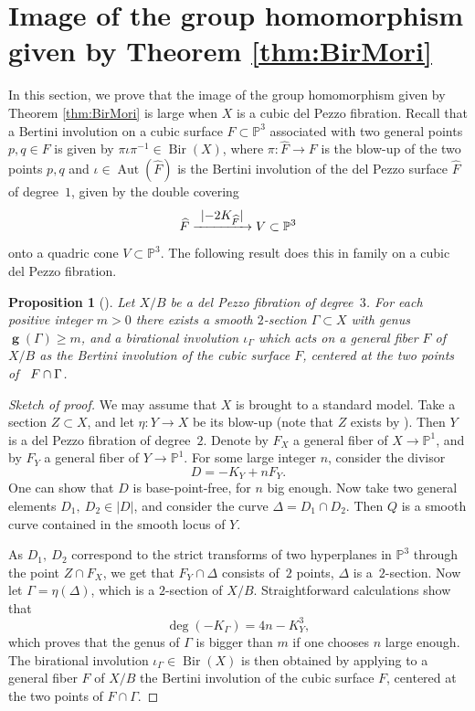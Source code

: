 \documentclass[JEP,XML,SOM,Unicode,NoFloatCountersInSection]{cedram}
\def\To#1{\mathchoice{\xrightarrow{\textstyle\kern4pt#1\kern3pt}}{\stackrel{#1}{\longrightarrow}}{}{}}
\DeclareMathOperator{\Bir}{Bir}
\DeclareMathOperator{\Aut}{Aut}
\DeclareMathOperator{\inv}{\boldsymbol{g}}
\theoremstyle{plain}
\newtheorem{prop}[thm]{Proposition}
\theoremstyle{definition}
\newcommand{\PP}{\mathbb P}
\begin{document}
\section{Image of the group homomorphism given by Theorem \ref{thm:BirMori}}\label{sec: image}

In this section, we prove that the image of the group homomorphism given by Theorem \ref{thm:BirMori} is large when $X$ is a cubic del Pezzo fibration. Recall that a Bertini involution on a cubic surface $F\subset \PP^3$ associated with two general points $p,q\in F$ is given by $\pi\iota\pi^{-1}\in \Bir(X)$, where $\pi\colon \widehat{F}\to F$ is the blow-up of the two points $p,q$ and $\iota\in \Aut(\widehat{F})$ is the Bertini involution of the del Pezzo surface $\widehat{F}$ of degree~$1$, given by the double covering
\[
\widehat{F}\To{\lvert -2K_{\widehat F}\rvert}V\subset \PP^3
\]
onto a quadric cone $V\subset \PP^3$. The following result does this in family on a cubic del Pezzo fibration.

\begin{prop}[{\cite[Prop.\,5.3]{BCDP}}]\label{prop: genus is unbounded}
Let $X/B$ be a del Pezzo fibration of degree~$3$. For each positive integer $m>0$ there exists a smooth $2$-section $\Gamma\subset X$ with genus $\inv(\Gamma)\ge m$, and a birational involution $\iota_\Gamma$ which acts on a general fiber $F$ of~$X/B$ as the Bertini involution of the cubic surface $F$, centered at the two points of ~$F\cap\nobreak \Gamma$.
\end{prop}
\begin{proof}[Sketch of proof]
We may assume that $X$ is brought to a standard model. Take a section $Z\subset X$, and let $\eta: Y\to X$ be its blow-up (note that $Z$ exists by \cite[IV, Th.\,6.8]{Kollar_rational}). Then $Y$ is a del Pezzo fibration of degree~$2$. Denote by $F_X$ a general fiber of $X\to\PP^1$, and by $F_Y$ a general fiber of $Y\to\PP^1$. For some large integer $n$, consider the divisor
\[
D=-K_Y+nF_Y.
\]
One can show that $D$ is base-point-free, for $n$ big enough. Now take two general elements $D_1,\ D_2\in |D|$, and consider the curve $\Delta=D_1\cap D_2$. Then $Q$ is a smooth curve contained in the smooth locus of $Y$.

As $D_1,\ D_2$ correspond to the strict transforms of two hyperplanes in $\PP^3$ through the point $Z\cap F_X$, we get that $F_Y\cap\Delta$ consists of~$2$ points, \ie $\Delta$ is a~$2$-section. Now let $\Gamma=\eta(\Delta)$, which is a $2$-section of $X/B$. Straightforward calculations show that
\[
\deg(-K_\Gamma)=4n-K_Y^3,
\]
which proves that the genus of $\Gamma$ is bigger than $m$ if one chooses $n$ large enough. The birational involution $\iota_\Gamma\in \Bir(X)$ is then obtained by applying to a general fiber $F$ of $X/B$ the Bertini involution of the cubic surface $F$, centered at the two points of $F\cap \Gamma$.
\end{proof}
\end{document}
